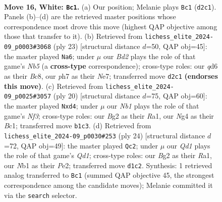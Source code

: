 \documentclass[11pt]{article}
\begin{document}
\clearpage

\begin{figure}[p]\centering
\begin{subfigure}{0.46\textwidth}\centering
\resizebox{\linewidth}{!}{%
\newchessgame
\chessboard[
  setfen={rnbr2k1/1p2bppp/pn1qp3/8/3p2N1/1Pp3P1/P2BPPBP/RN1QRK2 w - - 0 16},
  showmover=false,
  pgfstyle=straightmove, color=movearrow, markmove={d2-c1}
]}
\caption{}
\end{subfigure}\hfill
\begin{subfigure}{0.46\textwidth}\centering
\resizebox{\linewidth}{!}{%
\newchessgame
\chessboard[
  setfen={r1bq1rk1/2ppnpbp/6p1/pp1P4/1n2P3/PB3N2/1P3PPP/RNBQ1RK1 b - - 0 12},
  showmover=false,
  pgfstyle=straightmove, color=movearrow, markmove={b4-a6}
]}
\caption{}
\end{subfigure}
\\[4pt]
\begin{subfigure}{0.46\textwidth}\centering
\resizebox{\linewidth}{!}{%
\newchessgame
\chessboard[
  setfen={r1bq1rk1/2p1bppp/pn1p1n2/8/3pP3/1BN2N2/1PP2PPP/R1BQ1RK1 w - - 0 11},
  showmover=false,
  pgfstyle=straightmove, color=movearrow, markmove={f3-d4}
]}
\caption{}
\end{subfigure}\hfill
\begin{subfigure}{0.46\textwidth}\centering
\resizebox{\linewidth}{!}{%
\newchessgame
\chessboard[
  setfen={1n1q1rk1/rbp2ppp/p3p3/1p1nN3/1b1PN3/1P4P1/3BPPBP/R2Q1RK1 w - - 3 13},
  showmover=false,
  pgfstyle=straightmove, color=movearrow, markmove={d1-c2}
]}
\caption{}
\end{subfigure}
\caption{\textbf{Move 16, White: \texttt{Bc1}.} (a) Our position; Melanie plays \texttt{Bc1} (\texttt{d2c1}). Panels (b)--(d) are the retrieved master positions whose correspondence most drove this move (highest QAP objective among those that transfer to it). (b) Retrieved from \texttt{lichess\_elite\_2024-09\_p0003\#3068} (ply 23) [structural distance $d$=50, QAP obj=45]: the master played \texttt{Na6}; under $\mu$ our \emph{Bd2} plays the role of that game's \emph{Nb5} (a \textbf{cross-type} correspondence); cross-type roles: our \emph{q}d6 as their \emph{B}c8, our \emph{p}h7 as their \emph{N}e7; transferred move \texttt{d2c1} \textbf{(endorses this move)}. (c) Retrieved from \texttt{lichess\_elite\_2024-09\_p0025\#3057} (ply 20) [structural distance $d$=75, QAP obj=60]: the master played \texttt{Nxd4}; under $\mu$ our \emph{Nb1} plays the role of that game's \emph{Nf3}; cross-type roles: our \emph{B}g2 as their \emph{R}a1, our \emph{N}g4 as their \emph{B}c1; transferred move \texttt{b1c3}. (d) Retrieved from \texttt{lichess\_elite\_2024-09\_p0030\#253} (ply 24) [structural distance $d$=72, QAP obj=49]: the master played \texttt{Qc2}; under $\mu$ our \emph{Qd1} plays the role of that game's \emph{Qd1}; cross-type roles: our \emph{B}g2 as their \emph{R}a1, our \emph{N}b1 as their \emph{P}e2; transferred move \texttt{d1c2}. Synthesis: 1 retrieved analog transferred to \texttt{Bc1} (summed QAP objective 45, the strongest correspondence among the candidate moves); Melanie committed it via the \texttt{search} selector.}
\label{fig:thought-m30}
\end{figure}
\end{document}
